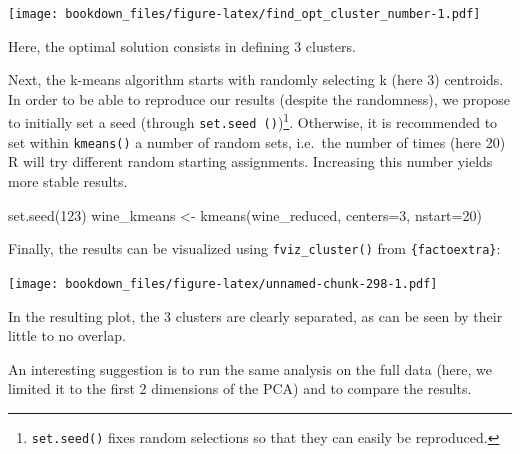 \documentclass[
]{krantz}
\makeatletter
\newenvironment{Shaded}{\begin{snugshade}}{\end{snugshade}}
\newcommand{\AttributeTok}[1]{\textcolor[rgb]{0.61,0.61,0.61}{#1}}
\newcommand{\ConstantTok}[1]{\textcolor[rgb]{0,0,0}{#1}}
\newcommand{\DecValTok}[1]{\textcolor[rgb]{0.06,0.06,0.06}{#1}}
\newcommand{\FunctionTok}[1]{\textcolor[rgb]{0,0,0}{#1}}
\newcommand{\NormalTok}[1]{#1}
\newcommand{\OtherTok}[1]{\textcolor[rgb]{0.37,0.37,0.37}{#1}}
\newcommand{\SpecialCharTok}[1]{\textcolor[rgb]{0,0,0}{#1}}
\newcommand{\StringTok}[1]{\textcolor[rgb]{0.5,0.5,0.5}{#1}}
\renewenvironment{quote}{\begin{VF}}{\end{VF}}
\newenvironment{kframe}{%
\medskip{}
\setlength{\fboxsep}{.8em}
 \def\at@end@of@kframe{}%
 \ifinner\ifhmode%
  \def\at@end@of@kframe{\end{minipage}}%
  \begin{minipage}{\columnwidth}%
 \fi\fi%
 \def\FrameCommand##1{\hskip\@totalleftmargin \hskip-\fboxsep
 \colorbox{shadecolor}{##1}\hskip-\fboxsep
     \hskip-\linewidth \hskip-\@totalleftmargin \hskip\columnwidth}%
 \MakeFramed {\advance\hsize-\width
   \@totalleftmargin\z@ \linewidth\hsize
   \@setminipage}}%
 {\par\unskip\endMakeFramed%
 \at@end@of@kframe}
\renewenvironment{Shaded}{\begin{kframe}}{\end{kframe}}
\makeatother
\begin{document}
\texttt{[image: bookdown\_files/figure-latex/find\_opt\_cluster\_number-1.pdf]}

Here, the optimal solution consists in defining 3 clusters.

Next, the k-means algorithm starts with randomly selecting k (here 3) centroids. In order to be able to reproduce our results (despite the randomness), we propose to initially set a seed (through \texttt{set.seed\ ()})\footnote{\texttt{set.seed()} fixes random selections so that they can easily be reproduced.}. Otherwise, it is recommended to set within \texttt{kmeans()} a number of random sets, i.e.~the number of times (here 20) R will try different random starting assignments. Increasing this number yields more stable results.

\begin{Shaded}
\begin{Highlighting}[]
\FunctionTok{set.seed}\NormalTok{(}\DecValTok{123}\NormalTok{)}
\NormalTok{wine\_kmeans }\OtherTok{\textless{}{-}} \FunctionTok{kmeans}\NormalTok{(wine\_reduced, }\AttributeTok{centers=}\DecValTok{3}\NormalTok{, }\AttributeTok{nstart=}\DecValTok{20}\NormalTok{)}
\end{Highlighting}
\end{Shaded}

Finally, the results can be visualized using \texttt{fviz\_cluster()} from \texttt{\{factoextra\}}:

\begin{Shaded}
\end{Shaded}

\texttt{[image: bookdown\_files/figure-latex/unnamed-chunk-298-1.pdf]}

In the resulting plot, the 3 clusters are clearly separated, as can be seen by their little to no overlap.

\begin{quote}
An interesting suggestion is to run the same analysis on the full data (here, we limited it to the first 2 dimensions of the PCA) and to compare the results.
\end{quote}
\end{document}
